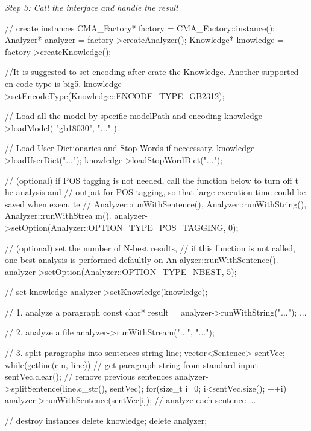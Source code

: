 {\itshape Step 3: Call the interface and handle the result\/}


\begin{DoxyCode}
// create instances
CMA_Factory* factory = CMA_Factory::instance();
Analyzer* analyzer = factory->createAnalyzer();
Knowledge* knowledge = factory->createKnowledge();

//It is suggested to set encoding after crate the Knowledge. Another supported en
      code type is big5.
knowledge->setEncodeType(Knowledge::ENCODE_TYPE_GB2312);

// Load all the model by specific modelPath and encoding
knowledge->loadModel( "gb18030", "..." ).

// Load User Dictionaries and Stop Words if neccessary.
knowledge->loadUserDict("...");
knowledge->loadStopWordDict("...");
 
// (optional) if POS tagging is not needed, call the function below to turn off t
      he analysis and 
// output for POS tagging, so that large execution time could be saved when execu
      te 
// Analyzer::runWithSentence(), Analyzer::runWithString(), Analyzer::runWithStrea
      m().
analyzer->setOption(Analyzer::OPTION_TYPE_POS_TAGGING, 0);

// (optional) set the number of N-best results,
// if this function is not called, one-best analysis is performed defaultly on An
      alyzer::runWithSentence().
analyzer->setOption(Analyzer::OPTION_TYPE_NBEST, 5);

// set knowledge
analyzer->setKnowledge(knowledge);

// 1. analyze a paragraph
const char* result = analyzer->runWithString("...");
...

// 2. analyze a file
analyzer->runWithStream("...", "...");

// 3. split paragraphs into sentences
string line;
vector<Sentence> sentVec;
while(getline(cin, line)) // get paragraph string from standard input
{
    sentVec.clear(); // remove previous sentences
    analyzer->splitSentence(line.c_str(), sentVec);
    for(size_t i=0; i<sentVec.size(); ++i)
    {
        analyzer->runWithSentence(sentVec[i]); // analyze each sentence
        ...
    }
}

// destroy instances
delete knowledge;
delete analyzer;
\end{DoxyCode}
 